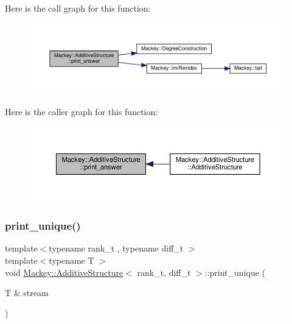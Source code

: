 Here is the call graph for this function\+:\nopagebreak
\begin{figure}[H]
\begin{center}
\leavevmode
\includegraphics[width=350pt]{classMackey_1_1AdditiveStructure_a2ab350a9e5187964b9cf42c3f36805fa_cgraph}
\end{center}
\end{figure}
Here is the caller graph for this function\+:\nopagebreak
\begin{figure}[H]
\begin{center}
\leavevmode
\includegraphics[width=350pt]{classMackey_1_1AdditiveStructure_a2ab350a9e5187964b9cf42c3f36805fa_icgraph}
\end{center}
\end{figure}
\mbox{\label{classMackey_1_1AdditiveStructure_a82ea44d284efe410fb5d43c6a41dd3ed}} 
\subsubsection{\texorpdfstring{print\+\_\+unique()}{print\_unique()}}
{\footnotesize\ttfamily template$<$typename rank\+\_\+t , typename diff\+\_\+t $>$ \\
template$<$typename T $>$ \\
void \hyperlink{classMackey_1_1AdditiveStructure}{Mackey\+::\+Additive\+Structure}$<$ rank\+\_\+t, diff\+\_\+t $>$\+::print\+\_\+unique (\begin{DoxyParamCaption}\item[{T \&}]{stream }\end{DoxyParamCaption})}



